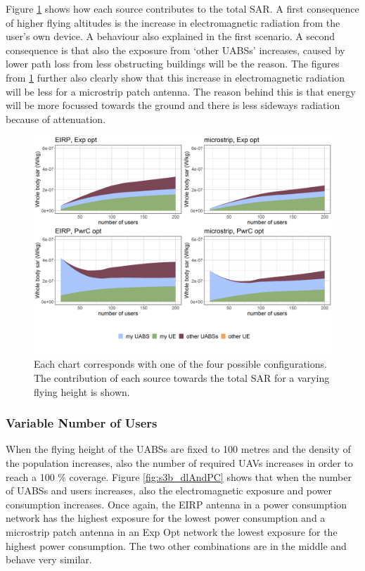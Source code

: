 \documentclass[twocolumn]{phdsymp} %
\begin{document}
Figure \ref{fig:s3a_fourSourcesMatrix} shows how each source contributes to the total \gls{SAR}.
A first consequence of higher flying altitudes is the increase in electromagnetic radiation from the user's own device.
A behaviour also explained in the first scenario.
A second  consequence is that also 
 the exposure from `other \gls{UABS}s' increases, caused by lower path loss from less obstructing buildings will be the reason.
The figures from \ref{fig:s3a_fourSourcesMatrix} further also clearly show that this increase 
in electromagnetic radiation will be less for a microstrip patch antenna. The reason behind this is that energy 
will be more focussed towards the ground and there is less sideways radiation because of attenuation.

\begin{figure}[h!]
  \includegraphics[width=\linewidth]{../results/s3/fhFourSources.png}
  \caption{Each chart corresponds with one of the four possible configurations. The contribution of each source towards the total 
  \gls{SAR} for a varying flying height is shown.}
  \label{fig:s3a_fourSourcesMatrix}
\end{figure}

\subsubsection{Variable Number of Users}
When the flying height of the \gls{UABS}s are fixed to 100 metres and the density of the population increases, also 
the number of required \gls{UAV}s increases in order to reach a 100 \% coverage.
Figure \ref{fig:s3b_dlAndPC} shows that when the number of \gls{UABS}s and users increases, 
also the electromagnetic exposure and power consumption increases.
Once again, the EIRP antenna in a power consumption network has the highest exposure for the lowest power consumption
and a microstrip patch antenna in an \gls{Exp Opt} network the lowest exposure for the highest power consumption.
The two other combinations are in the middle and behave very similar.
\end{document}
